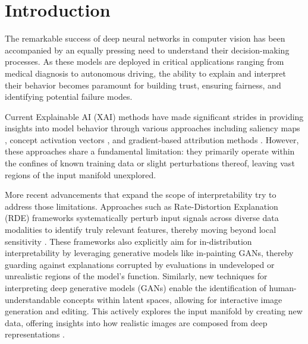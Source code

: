 
\chapter{Introduction}\label{r:introduction}

The remarkable success of deep neural networks in computer vision has been accompanied by an equally pressing need to understand their decision-making processes. As these models are deployed in critical applications ranging from medical diagnosis to autonomous driving, the ability to explain and interpret their behavior becomes paramount for building trust, ensuring fairness, and identifying potential failure modes.

Current Explainable AI (XAI) methods have made significant strides in providing insights into model behavior through various approaches including saliency maps \citep{simonyan2014deepinsideconvolutionalnetworks}, concept activation vectors \citep{kim2018interpretabilityfeatureattributionquantitative}, and gradient-based attribution methods \citep{sundararajan2017axiomaticattributiondeepnetworks}. However, these approaches share a fundamental limitation: they primarily operate within the confines of known training data or slight perturbations thereof, leaving vast regions of the input manifold unexplored.

More recent advancements that expand the scope of interpretability try to address those limitations. Approaches such as Rate-Distortion Explanation (RDE) frameworks systematically perturb input signals across diverse data modalities to identify truly relevant features, thereby moving beyond local sensitivity \citep{Kolek2022}. These frameworks also explicitly aim for in-distribution interpretability by leveraging generative models like in-painting GANs, thereby guarding against explanations corrupted by evaluations in undeveloped or unrealistic regions of the model's function. Similarly, new techniques for interpreting deep generative models (GANs) enable the identification of human-understandable concepts within latent spaces, allowing for interactive image generation and editing. This actively explores the input manifold by creating new data, offering insights into how realistic images are composed from deep representations \citep{zhou2022interpretinggenerativeadversarialnetworks, Karimi2022}.

